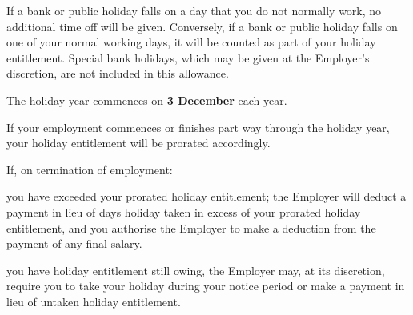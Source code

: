 \documentclass[a4paper,11pt,onecolumn ]{article}
\begin{document}
\begin{legal}
\begin{legal}
If a bank or public holiday falls on a day that you do not normally work, no additional time 
off will be given. Conversely, if a bank or public holiday falls on one of your normal 
working days, it will be counted as part of your holiday entitlement. Special bank holidays, 
which may be given at the Employer’s discretion, are not included in this allowance. 

\item The holiday year commences on \textbf{3 December} each year.
\item If your employment commences or finishes part way through the holiday year,
your holiday entitlement will be prorated accordingly.

\item If, on termination of employment:

\begin{legal}
  \item you have exceeded your prorated holiday entitlement; the Employer will
  deduct a payment in lieu of days holiday taken in excess of your prorated
  holiday entitlement, and you authorise the Employer to make a deduction
  from the payment of any final salary.
  \item you have holiday entitlement still owing, the Employer may, at its
  discretion, require you to take your holiday during your notice period or
  make a payment in lieu of untaken holiday entitlement.
\end{legal}


\end{legal}
\end{legal}
\end{document}
